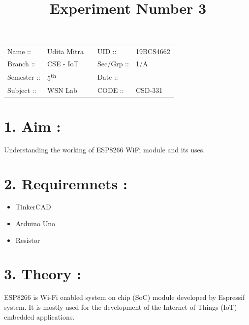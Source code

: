 \documentclass[14pt]{extarticle}
\title{%
    \textbf{
    \vspace{-3em} \\ 
    \Large Experiment Number 3\\
    \vspace{-4em}
    }
}
\author{}
\date{}
\begin{document}
\maketitle %

\section*{}
    \begin{tabular}{ llp{2cm}ll } 
        Name :: & Udita Mitra & & UID :: & 19BCS4662 \\ 
        Branch :: & CSE - IoT & & Sec/Grp :: & 1/A \\ 
        Semester :: & 5\textsuperscript{th} & & Date :: & \shortdate{\today} \\
        Subject :: & WSN Lab & & CODE :: & CSD-331  \\ 
    \end{tabular}
    
\vspace{1em}

\section*{\normalsize 1. Aim :}

Understanding the working of ESP8266 WiFi module and its uses.

\section*{\normalsize 2. Requiremnets :}

\begin{itemize}
  \item TinkerCAD
  \item Arduino Uno
  \item Resistor
\end{itemize}

\section*{\normalsize 3. Theory :}

ESP8266 is Wi-Fi enabled system on chip (SoC) module developed by Espressif system. It is mostly used for the development of the Internet of Things (IoT) embedded applications. 
\end{document}
